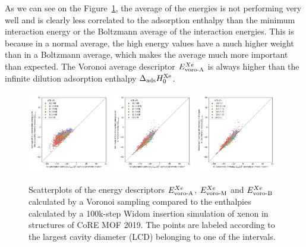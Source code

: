 \documentclass[main]{subfiles}
\begin{document}
As we can see on the Figure~\ref{fgr:compa_voro_0}, the average of the energies is not performing very well and is clearly less correlated to the adsorption enthalpy than the minimum interaction energy or the Boltzmann average of the interaction energies. This is because in a normal average, the high energy values have a much higher weight than in a Boltzmann average, which makes the average much more important than expected. The Voronoi average descriptor $E_{\text{voro-A}}^{Xe}$ is always higher than the infinite dilution adsorption enthalpy $\Delta_{\text{ads}} H_{0}^{\text{Xe}}$. 

\begin{figure}[ht]
  \centering
    \includegraphics[width=0.32\textwidth]{figures/3-fastsim/H_Xe_0_vs_E_voro_A_overview.jpg}
    \includegraphics[width=0.32\textwidth]{figures/3-fastsim/H_Xe_0_vs_E_voro_M_overview.jpg}
    \includegraphics[width=0.32\textwidth]{figures/3-fastsim/H_Xe_0_vs_E_voro_B_overview.jpg}
    \caption{Scatterplots of the energy descriptors $E_{\text{voro-A}}^{Xe}$, $E_{\text{voro-M}}^{Xe}$ and $E_{\text{voro-B}}^{Xe}$ calculated by a Voronoi sampling compared to the enthalpies calculated by a 100k-step Widom insertion simulation of xenon in structures of CoRE MOF 2019. The points are labeled according to the largest cavity diameter (LCD) belonging to one of the intervals.}\label{fgr:compa_voro_0}
\end{figure}
\end{document}
